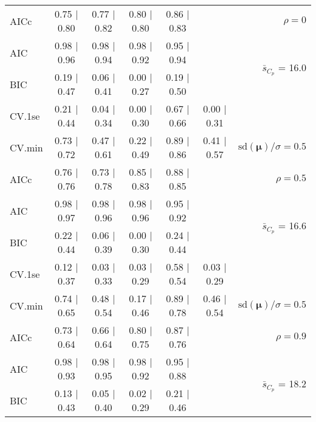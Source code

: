 \documentclass[12pt]{article}
\newcommand{\mr}[1]{\mathrm{#1}}
\newcommand{\bm}[1]{\mathbf{#1}}
\begin{document}
\begin{table}[p]
\begin{center}
\begin{tabular}{l*{5}{c}|r}
AICc & 0.75 $\mid$ 0.80 & 0.77 $\mid$ 0.82 & 0.80 $\mid$ 0.80 & 0.86 $\mid$ 0.83 & & $\rho=0$ \\
AIC & 0.98 $\mid$ 0.96 & 0.98 $\mid$ 0.94 & 0.98 $\mid$ 0.92 & 0.95 $\mid$ 0.94 & & \multirow{2}{*}{$\bar{s}_{C_p}$ = 16.0} \\
BIC & 0.19 $\mid$ 0.47 & 0.06 $\mid$ 0.41 & 0.00 $\mid$ 0.27 & 0.19 $\mid$ 0.50 & & \\
 \hline 
CV.1se & 0.21 $\mid$ 0.44 & 0.04 $\mid$ 0.34 & 0.00 $\mid$ 0.30 & 0.67 $\mid$ 0.66 & 0.00 $\mid$ 0.31 &\\
CV.min & 0.73 $\mid$ 0.72 & 0.47 $\mid$ 0.61 & 0.22 $\mid$ 0.49 & 0.89 $\mid$ 0.86 & 0.41 $\mid$ 0.57 &  $\mr{sd}(\bm{\mu})/\sigma=0.5$ \\
AICc & 0.76 $\mid$ 0.76 & 0.73 $\mid$ 0.78 & 0.85 $\mid$ 0.83 & 0.88 $\mid$ 0.85 & & $\rho=0.5$ \\
AIC & 0.98 $\mid$ 0.97 & 0.98 $\mid$ 0.96 & 0.98 $\mid$ 0.96 & 0.95 $\mid$ 0.92 & & \multirow{2}{*}{$\bar{s}_{C_p}$ = 16.6} \\
BIC & 0.22 $\mid$ 0.44 & 0.06 $\mid$ 0.39 & 0.00 $\mid$ 0.30 & 0.24 $\mid$ 0.44 & & \\
 \hline 
CV.1se & 0.12 $\mid$ 0.37 & 0.03 $\mid$ 0.33 & 0.03 $\mid$ 0.29 & 0.58 $\mid$ 0.54 & 0.03 $\mid$ 0.29 &\\
CV.min & 0.74 $\mid$ 0.65 & 0.48 $\mid$ 0.54 & 0.17 $\mid$ 0.46 & 0.89 $\mid$ 0.78 & 0.46 $\mid$ 0.54 &  $\mr{sd}(\bm{\mu})/\sigma=0.5$ \\
AICc & 0.73 $\mid$ 0.64 & 0.66 $\mid$ 0.64 & 0.80 $\mid$ 0.75 & 0.87 $\mid$ 0.76 & & $\rho=0.9$ \\
AIC & 0.98 $\mid$ 0.93 & 0.98 $\mid$ 0.95 & 0.98 $\mid$ 0.92 & 0.95 $\mid$ 0.88 & & \multirow{2}{*}{$\bar{s}_{C_p}$ = 18.2} \\
BIC & 0.13 $\mid$ 0.43 & 0.05 $\mid$ 0.40 & 0.02 $\mid$ 0.29 & 0.21 $\mid$ 0.46 & & \\
 \hline 
 \end{tabular}
\end{center}
\vspace{-1cm}
\end{table}
\end{document}
